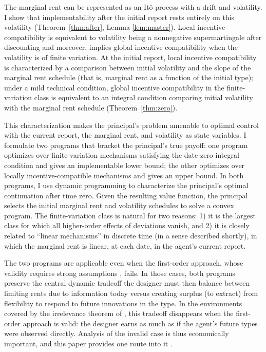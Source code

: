 \documentclass[12pt]{article}
\begin{document}
The marginal rent can be represented as an It\^{o} process with a drift and volatility. I show that implementability after
the initial report rests entirely on this volatility (Theorem~\ref{thm:after}, Lemma \ref{lem:master}). Local incentive compatibility is equivalent to volatility being a nonnegative supermartingale after discounting and moreover, implies global incentive compatibility when the volatility is of finite variation. At the initial report, local incentive compatibility is characterized by a comparison between initial volatility and the slope of the marginal rent schedule (that is, marginal rent as a function of the initial type); under a mild technical condition, global incentive compatibility in the finite-variation class is equivalent to an integral condition comparing initial volatility with the marginal rent schedule (Theorem~\ref{thm:zero}).


This characterization makes the principal's problem amenable to optimal control with the current report, the marginal rent,
and volatility as state variables. I formulate two programs that bracket the principal's true payoff: one program optimizes over finite-variation
mechanisms satisfying the date-zero integral condition and gives an
implementable lower bound; the other optimizes over locally
incentive-compatible mechanisms and gives an upper bound. 
In both programs, I use dynamic programming to characterize the principal's optimal continuation after time zero. Given the resulting value function, the principal selects the initial marginal rent and volatility schedules to solve a convex program. The finite-variation class is natural for two reasons: 1) it is the largest class for which all higher-order effects of deviations vanish, and 2) it is closely related to ``linear
mechanisms'' in discrete time (in a sense described shortly), in which the marginal rent is
linear, at each date, in the agent’s current report.


The two programs are applicable even when the first-order approach, whose validity requires strong assumptions \citep{pavan2014dynamic,battaglini2019optimal}, fails.  In those cases, both programs preserve the central
dynamic tradeoff the designer must then balance between limiting rents due to information today  versus creating surplus (to extract) from flexibility to respond to future innovations in the type. In
the environments covered by the irrelevance theorem
of \citet{eso2017dynamic}, this tradeoff disappears when the
first-order approach is valid: the designer earns as much as if the
agent's future types were observed directly. Analysis of the invalid case is thus economically
important, and this paper provides one route into it \citep{pavan2017dynamic}.
\end{document}
